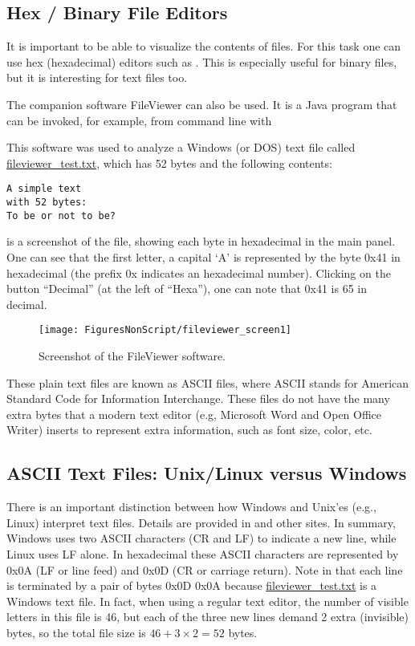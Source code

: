 \subsection{Hex / Binary File Editors}

It is important to be able to visualize the contents of files. For this task one can use hex (hexadecimal) editors such as . This is especially useful for binary files, but it is interesting for text files too.

The companion software FileViewer can also be used. It is a Java program that can be invoked, for example, from command line with\\

This software was used to analyze a Windows (or DOS) text file called \url{fileviewer_test.txt}, which has 52 bytes and the following contents:
\begin{verbatim}
A simple text
with 52 bytes:
To be or not to be?
\end{verbatim}
 is a screenshot of the file, showing each byte in hexadecimal in the main panel. One can see that the first letter, a capital `A' is represented by the byte 0x41 in hexadecimal (the prefix 0x indicates an hexadecimal number). Clicking on the button ``Decimal'' (at the left of ``Hexa''), one can note that 0x41 is 65 in decimal.

\begin{figure}
	\centering
		\texttt{[image: FiguresNonScript/fileviewer\_screen1]}		
	\caption{Screenshot of the FileViewer software.\label{fig:fileviewer_screen1}}
\end{figure}


These plain text files are known as ASCII files, where ASCII stands for American Standard Code for Information Interchange. These files do not have the many extra bytes that a modern text editor (e.g, Microsoft Word and Open Office Writer) inserts to represent extra information, such as font size, color, etc.

\subsection{ASCII Text Files: Unix/Linux versus Windows}

There is an important distinction between how Windows and Unix'es (e.g., Linux) interpret text files. 
Details are provided in  and other sites. In summary, Windows uses two ASCII characters (CR and LF) to indicate a new line, while Linux uses LF alone. In hexadecimal these ASCII characters are represented by 0x0A (LF or line feed) and 0x0D (CR or carriage return). Note in  that each line is terminated by a pair of bytes 0x0D 0x0A because \url{fileviewer_test.txt} is a Windows text file. In fact, when using a regular text editor, the number of visible letters in this file is 46, but each of the three new lines demand 2 extra (invisible) bytes, so the total file size is $46+3 \times 2 = 52$ bytes.

